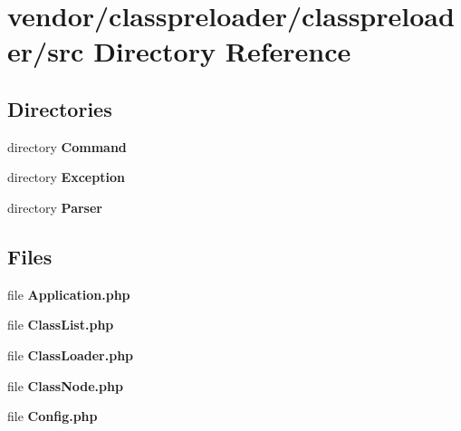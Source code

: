 \section{vendor/classpreloader/classpreloader/src Directory Reference}
\label{dir_a07176f0bd2b112d4dadbe515901dc73}
\subsection*{Directories}
\begin{DoxyCompactItemize}
\item 
directory {\bf Command}
\item 
directory {\bf Exception}
\item 
directory {\bf Parser}
\end{DoxyCompactItemize}
\subsection*{Files}
\begin{DoxyCompactItemize}
\item 
file {\bf Application.\+php}
\item 
file {\bf Class\+List.\+php}
\item 
file {\bf Class\+Loader.\+php}
\item 
file {\bf Class\+Node.\+php}
\item 
file {\bf Config.\+php}
\end{DoxyCompactItemize}
